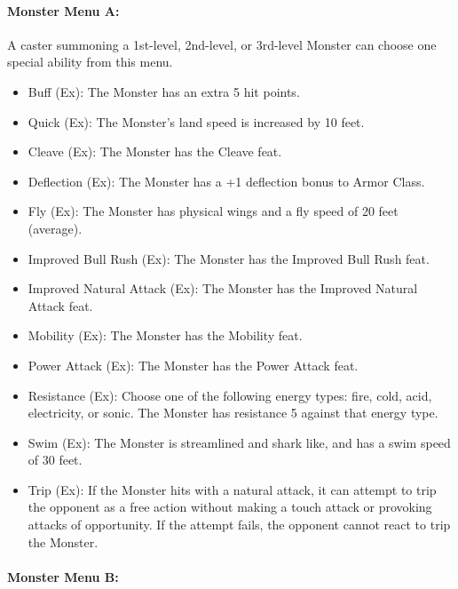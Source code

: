 \paragraph{Monster Menu A:}

A caster summoning a 1st-level, 2nd-level, or 3rd-level Monster can choose one 
special ability from this menu.
\begin{itemize}
\item Buff (Ex): The Monster has an extra 5 hit points.
\item Quick (Ex): The Monster's land speed is increased by 10 feet.
\item Cleave (Ex): The Monster has the Cleave feat. 
\item Deflection (Ex): The Monster has a +1 deflection bonus to Armor Class.
\item Fly (Ex): The Monster has physical wings and a fly speed of 20 feet (average).
\item Improved Bull Rush (Ex): The Monster has the Improved Bull Rush feat.
\item Improved Natural Attack (Ex): The Monster has the Improved Natural Attack feat.
\item Mobility (Ex): The Monster has the Mobility feat.
\item Power Attack (Ex): The Monster has the Power Attack feat.
\item Resistance (Ex): Choose one of the following energy types: fire, cold, acid, electricity, or sonic. 
The Monster has resistance 5 against that energy type.
\item Swim (Ex): The Monster is streamlined and shark like, and has a swim speed of 30 feet.
\item Trip (Ex): If the Monster hits with a natural attack, 
it can attempt to trip the opponent as a free action without 
making a touch attack or provoking attacks of opportunity. 
If the attempt fails, the opponent cannot react to trip the Monster.
\end{itemize}

\paragraph{Monster Menu B:}


